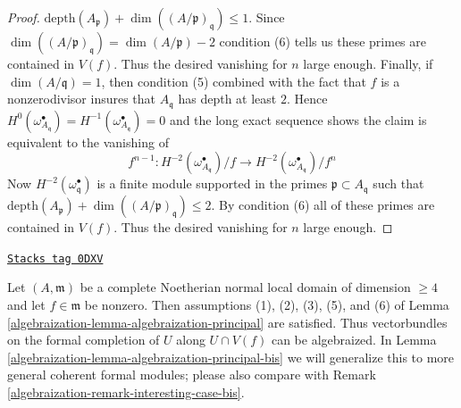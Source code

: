 \begin{proof}
$\text{depth}(A_\mathfrak p) + \dim((A/\mathfrak p)_\mathfrak q) \leq 1$.
Since $\dim((A/\mathfrak p)_\mathfrak q) = \dim(A/\mathfrak p) - 2$
condition (6) tells us these primes are contained in $V(f)$.
Thus the desired vanishing for $n$ large enough.
Finally, if $\dim(A/\mathfrak q) = 1$, then condition (5) combined
with the fact that $f$ is a nonzerodivisor
insures that $A_\mathfrak q$ has depth at least $2$. Hence
$H^0(\omega_{A_\mathfrak q}^\bullet) =
H^{-1}(\omega_{A_\mathfrak q}^\bullet) = 0$
and the long exact sequence shows the claim is
equivalent to the vanishing of
$$
f^{n - 1} :
H^{-2}(\omega_{A_\mathfrak q}^\bullet)/f \to
H^{-2}(\omega_{A_\mathfrak q}^\bullet)/f^n
$$
Now $H^{-2}(\omega^\bullet_\mathfrak q)$ is a finite
module supported in the primes $\mathfrak p \subset A_\mathfrak q$
such that $\text{depth}(A_\mathfrak p) + \dim((A/\mathfrak p)_\mathfrak q)
\leq 2$. By condition (6) all of these primes are contained in $V(f)$.
Thus the desired vanishing for $n$ large enough.
\end{proof}

\begin{remark}
\label{algebraization-remark-interesting-case}
\href{https://stacks.math.columbia.edu/tag/0DXV}{\texttt{Stacks tag 0DXV}}

Let $(A, \mathfrak m)$ be a complete Noetherian normal local domain
of dimension $\geq 4$ and let $f \in \mathfrak m$ be nonzero.
Then assumptions (1), (2), (3), (5), and (6) of
Lemma \ref{algebraization-lemma-algebraization-principal}
are satisfied. Thus vectorbundles
on the formal completion of $U$ along $U \cap V(f)$
can be algebraized. In Lemma \ref{algebraization-lemma-algebraization-principal-bis}
we will generalize this to more general coherent formal modules;
please also compare with Remark \ref{algebraization-remark-interesting-case-bis}.
\end{remark}

